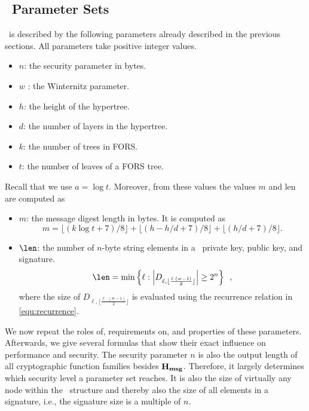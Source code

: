 \subsection{\SPHINCSA\ Parameter Sets}

\SPHINCSA\ is described by the following parameters already described in the previous sections. All parameters take positive integer values.

\begin{itemize}

\item $n$: the security parameter in bytes.

\item $w$ : the Winternitz parameter.

\item $h$: the height of the hypertree.

\item $d$: the number of layers in the hypertree.

\item $k$: the number of trees in FORS.

\item $t$: the number of leaves of a FORS tree. 

\end{itemize}


Recall that we use $a=\log t$. Moreover, from these values the values $m$ and len are computed as
\begin{itemize}
    \item $ m $: the message digest length in bytes. It is computed as $$m=\lfloor(k\log t+7)/8\rfloor+\lfloor(h-h/d+7)/8\rfloor+\lfloor(h/d+7)/8\rfloor.$$
    \item $\len$: the number of $n$-byte string elements in a \WOTSCS\ private key, public key, and signature.
    $$
    \len = \min \left\{ \ell : \left| D_{\ell, \lfloor \frac{\ell \cdot (w-1)}{2} \rfloor} \right| \geq 2^n \right\} \enspace,
    $$
    where the size of $D_{\ell, \lfloor \frac{\ell \cdot (w-1)}{2} \rfloor}$ is evaluated using the recurrence relation in \cref{equ:recurrence}.
\end{itemize}

We now repeat the roles of, requirements on, and properties of these parameters. Afterwards, we give several formulas that show their exact influence on performance and security. The security parameter $n$ is also the output length of all cryptographic function families besides $\mathbf{H_{msg}}$. Therefore, it largely determines which security level a parameter set reaches. It is also the size of virtually any node within the \SPHINCSA\ structure and thereby also the size of all elements in a signature, i.e., the signature size is a multiple of $n$.

